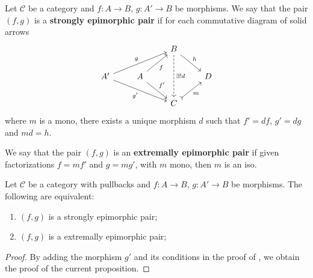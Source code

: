 \begin{mainbox}{}
    \begin{defi}
        Let $\mathcal{C}$ be a category and $f : A \to B$, $g : A' \to B$ be morphisms. We say that the pair $(f,g)$ is a \textbf{strongly epimorphic pair} if for each commutative diagram of solid arrows
    \[
\begin{tikzcd}
    &                                     & B \arrow[rd, "h"] \arrow[dd, "\exists ! d", dashed] &   \\
A' \arrow[rru, "g"] \arrow[rrd, "g'"'] & A \arrow[ru, "f"'] \arrow[rd, "f'"] &                                                     & D \\
    &                                     & C \arrow[ru, "m"', tail]                            &  
\end{tikzcd}
    \]
    where $m$ is a mono, there exists a unique morphism $d$ such that $f'=df$, $g'=dg$ and $md=h$.

    We say that the pair $(f,g)$ is an \textbf{extremally epimorphic pair} if given factorizations $f=mf'$ and $g=mg'$, with $m$ mono, then $m$ is an iso.
    \end{defi}
\end{mainbox}

\begin{mainbox}{}
    \begin{prop}\label{Eqivalence strong epi pair with iso}
    Let $\mathcal{C}$ be a category with pullbacks and $f : A \to B$, $g : A' \to B$ be morphisms. The following are equivalent:
    \begin{enumerate}
        \item $(f,g)$ is a strongly epimorphic pair;
        \item $(f,g)$ is a extremally epimorphic pair;
    \end{enumerate}
    \end{prop}
\end{mainbox}

\begin{subbox}{}
    \begin{proof}
        By adding the morphism $g'$ and its conditions in the proof of , we obtain the proof of the current proposition.
\end{proof}
\end{subbox}


